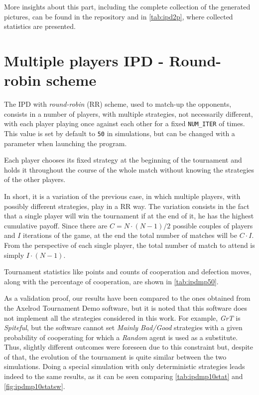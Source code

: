 \documentclass[journal,10pt,twoside]{IEEEtran}
\begin{document}
More insights about this part, including the complete collection of the generated pictures, can be found in the repository and in \autoref{tab:ipd2p}, where collected statistics are presented.

\section{Multiple players IPD - Round-robin scheme} \label{s:IPDMP}
The IPD with \textit{round-robin} (RR) scheme, used to match-up the opponents, consists in a number of players, with multiple strategies, not necessarily different, with each player playing once against each other for a fixed \texttt{NUM\_ITER} of times. This value is set by default to \texttt{50} in simulations, but can be changed with a parameter when launching the program.


Each player chooses its fixed strategy at the beginning of the tournament and holds it throughout the course of the whole match without knowing the strategies of the other players.

In short, it is a variation of the previous case, in which multiple players, with possibly different strategies, play in a RR way. The variation consists in the fact that a single player will win the tournament if at the end of it, he has the highest cumulative payoff.
Since there are $C=N\cdot (N-1)/2$ possible couples of players and $I$ iterations of the game, at the end the total number of matches will be $C\cdot I$. From the perspective of each single player, the total number of match to attend is simply $I\cdot(N-1)$.

Tournament statistics like points and counts of cooperation and defection moves, along with the percentage of cooperation, are shown in \autoref{tab:ipdmp50}.

As a validation proof, our results have been compared to the ones obtained from the Axelrod Tournament Demo software, \cite{demosw} but it is noted that this software does not implement all the strategies considered in this work. For example, \textit{GrT} is \textit{Spiteful}, but the software cannot set \textit{Mainly Bad/Good} strategies with a given probability of cooperating for which a \textit{Random} agent is used as a substitute. Thus, slightly different outcomes were foreseen due to this constraint but, despite of that, the evolution of the tournament is quite similar between the two simulations.
Doing a special simulation with only deterministic strategies leads indeed to the same results, as it can be seen comparing \autoref{tab:ipdmp10stat} and \autoref{fig:ipdmp10statsw}.
\end{document}
